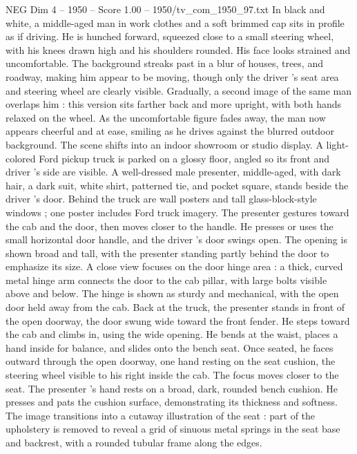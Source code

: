\begin{textsample}{NEG Dim 4 – 1950 – Score 1.00 – 1950/tv\_com\_1950\_97.txt}  \label{ex:f4_neg_070}
In black and white, a middle-aged man in work clothes and a soft brimmed cap sits in profile as if driving.
He is hunched forward, squeezed close to a small steering wheel, with his knees drawn high and his shoulders rounded.
His face looks strained and uncomfortable.
The background streaks past in a blur of houses, trees, and roadway, making him appear to be moving, though only the driver ’s seat area and steering wheel are clearly visible.
Gradually, a second image of the same man overlaps him : this version sits farther back and more upright, with both hands relaxed on the wheel.
As the uncomfortable figure fades away, the man now appears cheerful and at ease, smiling as he drives against the blurred outdoor background.
The scene shifts into an indoor showroom or studio display.
A light-colored Ford pickup truck is parked on a glossy floor, angled so its front and driver ’s side are visible.
A well-dressed male presenter, middle-aged, with dark hair, a dark suit, white shirt, patterned tie, and pocket square, stands beside the driver ’s door.
Behind the truck are wall posters and tall glass-block-style windows ; one poster includes Ford truck imagery.
The presenter gestures toward the cab and the door, then moves closer to the handle.
He presses or uses the small horizontal door handle, and the driver ’s door swings open.
The opening is shown broad and tall, with the presenter standing partly behind the door to emphasize its size.
A close view focuses on the door hinge area : a thick, curved metal hinge arm connects the door to the cab pillar, with large bolts visible above and below.
The hinge is shown as sturdy and mechanical, with the open door held away from the cab.
Back at the truck, the presenter stands in front of the open doorway, the door swung wide toward the front fender.
He steps toward the cab and climbs in, using the wide opening.
He bends at the waist, places a hand inside for balance, and slides onto the bench seat.
Once seated, he faces outward through the open doorway, one hand resting on the seat cushion, the steering wheel visible to his right inside the cab.
The focus moves closer to the seat.
The presenter ’s hand rests on a broad, dark, rounded bench cushion.
He presses and pats the cushion surface, demonstrating its thickness and softness.
The image transitions into a cutaway illustration of the seat : part of the upholstery is removed to reveal a grid of sinuous metal springs in the seat base and backrest, with a rounded tubular frame along the edges.

\end{textsample}
